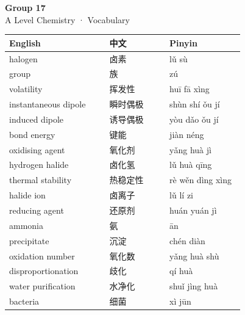 \documentclass[11pt]{article}
\begin{document}
\begin{center}
  {\LARGE\bfseries Group 17}\\[0.35em]
  {\large A Level Chemistry · Vocabulary}
\end{center}
\vspace{0.6em}

\begin{longtable}{@{}p{0.40\linewidth}p{0.24\linewidth}p{0.30\linewidth}@{}}
\toprule
\textbf{English} & \textbf{中文} & \textbf{Pinyin} \\
\midrule
\endhead
\bottomrule
\endlastfoot
halogen & 卤素 & lǔ sù \\
group & 族 & zú \\
volatility & 挥发性 & huī fā xìng \\
instantaneous dipole & 瞬时偶极 & shùn shí ǒu jí \\
induced dipole & 诱导偶极 & yòu dǎo ǒu jí \\
bond energy & 键能 & jiàn néng \\
oxidising agent & 氧化剂 & yǎng huà jì \\
hydrogen halide & 卤化氢 & lǔ huà qīng \\
thermal stability & 热稳定性 & rè wěn dìng xìng \\
halide ion & 卤离子 & lǔ lí zi \\
reducing agent & 还原剂 & huán yuán jì \\
ammonia & 氨 & ān \\
precipitate & 沉淀 & chén diàn \\
oxidation number & 氧化数 & yǎng huà shù \\
disproportionation & 歧化 & qí huà \\
water purification & 水净化 & shuǐ jìng huà \\
bacteria & 细菌 & xì jūn \\
\end{longtable}
\end{document}
